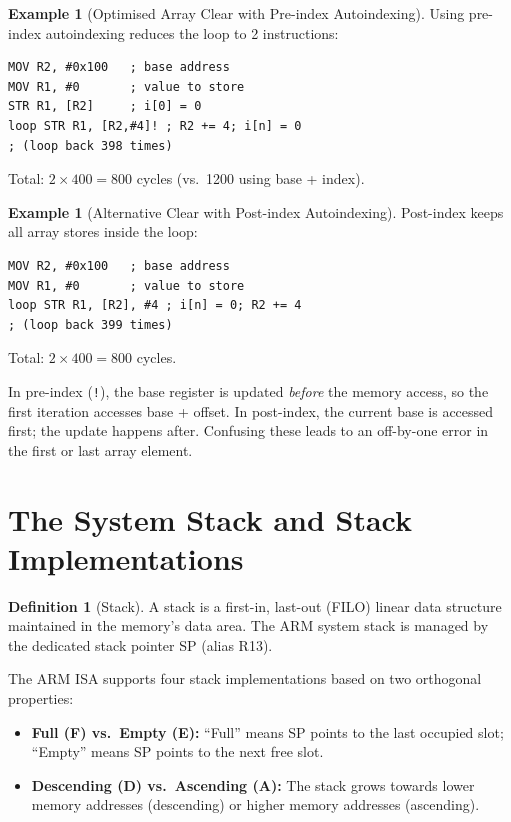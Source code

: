 \documentclass[11pt, a4paper, notitlepage]{report}
\theoremstyle{definition}
\newtheorem{definition}[theorem]{Definition}
\theoremstyle{remark}
\theoremstyle{definition}
\newtheorem{example}[theorem]{Example}
\begin{document}
\begin{example}[Optimised Array Clear with Pre-index Autoindexing]
Using pre-index autoindexing reduces the loop to 2 instructions:
\begin{lstlisting}
MOV R2, #0x100   ; base address
MOV R1, #0       ; value to store
STR R1, [R2]     ; i[0] = 0
loop STR R1, [R2,#4]! ; R2 += 4; i[n] = 0
; (loop back 398 times)
\end{lstlisting}
Total: $2 \times 400 = 800$ cycles (vs.\ 1200 using base + index).
\end{example}

\begin{example}[Alternative Clear with Post-index Autoindexing]
Post-index keeps all array stores inside the loop:
\begin{lstlisting}
MOV R2, #0x100   ; base address
MOV R1, #0       ; value to store
loop STR R1, [R2], #4 ; i[n] = 0; R2 += 4
; (loop back 399 times)
\end{lstlisting}
Total: $2 \times 400 = 800$ cycles.
\end{example}

\begin{examtip}[title={Pre- vs.\ Post-index Side Effects}]
In pre-index (\texttt{!}), the base register is updated \emph{before} the memory access, so the first iteration accesses base + offset. In post-index, the current base is accessed first; the update happens after. Confusing these leads to an off-by-one error in the first or last array element.
\end{examtip}

\section{The System Stack and Stack Implementations}

\begin{definition}[Stack]
\label{def:stack}
A stack is a first-in, last-out (FILO) linear data structure maintained in the memory's data area. The ARM system stack is managed by the dedicated stack pointer SP (alias R13).
\end{definition}

The ARM ISA supports four stack implementations based on two orthogonal properties:

\begin{itemize}
  \item \textbf{Full (F) vs.\ Empty (E):} ``Full'' means SP points to the last occupied slot; ``Empty'' means SP points to the next free slot.
  \item \textbf{Descending (D) vs.\ Ascending (A):} The stack grows towards lower memory addresses (descending) or higher memory addresses (ascending).
\end{itemize}
\end{document}
